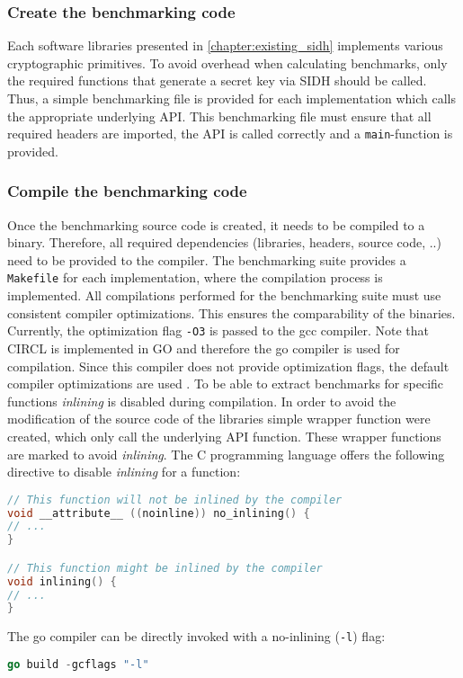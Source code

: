 \subsubsection{Create the benchmarking code}
Each software libraries presented in \autoref{chapter:existing_sidh} implements various cryptographic primitives. To avoid overhead when calculating benchmarks, only the required functions that generate a secret key via \gls{SIDH} should be called. Thus, a simple benchmarking file is provided for each implementation which calls the appropriate underlying API. This benchmarking file must ensure that all required headers are imported, the API is called correctly and a \texttt{main}-function is provided.

\subsubsection{Compile the benchmarking code}
Once the benchmarking source code is created, it needs to be compiled to a binary. Therefore, all required dependencies (libraries, headers, source code, ..) need to be provided to the compiler. The benchmarking suite provides a \texttt{Makefile} for each implementation, where the compilation process is implemented.
All compilations performed for the benchmarking suite must use consistent compiler optimizations. This ensures the comparability of the binaries. Currently, the optimization flag \texttt{-O3} is passed to the gcc compiler. Note that CIRCL is implemented in GO and therefore the go compiler is used for compilation. Since this compiler does not provide optimization flags, the default compiler optimizations are used \parencite{gowiki2020compiler}.
To be able to extract benchmarks for specific functions \textit{inlining} is disabled during compilation. In order to avoid the modification of the source code of the libraries simple wrapper function were created, which only call the underlying API function. These wrapper functions are marked to avoid \textit{inlining}. The C programming language offers the following directive to disable \textit{inlining} for a function:
\begin{lstlisting}[language=C]
// This function will not be inlined by the compiler
void __attribute__ ((noinline)) no_inlining() {
// ...
}

// This function might be inlined by the compiler
void inlining() {
// ...
}
\end{lstlisting}
The go compiler can be directly invoked with a no-inlining (\texttt{-l}) flag:
\begin{lstlisting}[language=Go]
go build -gcflags "-l"
\end{lstlisting}


